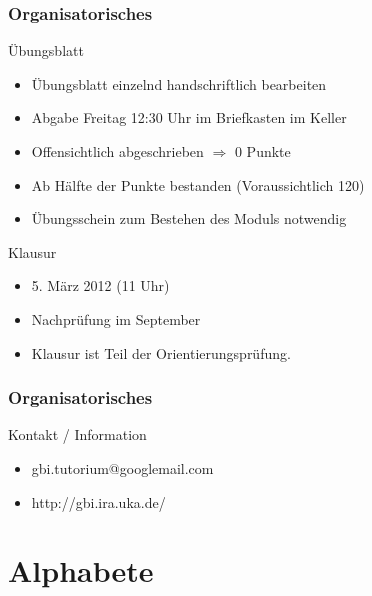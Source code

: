 \documentclass{beamer}
\begin{document}
\begin {frame}
	\frametitle {Organisatorisches}
	\begin{block}{Übungsblatt}
        		\begin{itemize}
			\item Übungsblatt einzelnd handschriftlich bearbeiten
			\item Abgabe Freitag 12:30 Uhr im Briefkasten im Keller
			\item Offensichtlich abgeschrieben $\Rightarrow$ 0 Punkte
			\item Ab Hälfte der Punkte bestanden (Voraussichtlich 120)
			\item Übungsschein zum Bestehen des Moduls notwendig
		\end{itemize}
	\end{block}
\end {frame}

\begin{frame}

	\begin{block}{Klausur}
        		\begin{itemize}
			\item 5. März 2012 (11 Uhr)
			\item Nachprüfung im September
			\item Klausur ist Teil der Orientierungsprüfung.
		\end{itemize}
	\end{block}
	\pause
	\frametitle {Organisatorisches}
	\begin{block}{Kontakt / Information}
		\begin{itemize}
			\item gbi.tutorium@googlemail.com
			\item http://gbi.ira.uka.de/
		\end{itemize}
	\end{block}
\end{frame}

\section{Alphabete}
\end{document}
